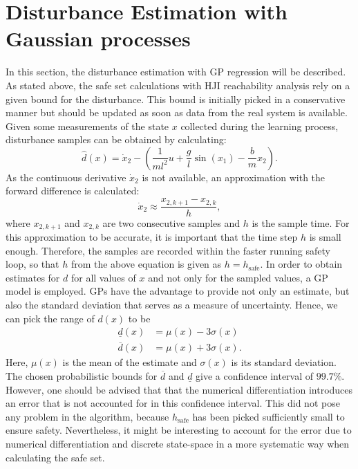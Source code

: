 \documentclass[../main.tex]{subfiles}
\begin{document}
\section{Disturbance Estimation with Gaussian processes}\label{sec:implementation_GP}
In this section, the disturbance estimation with GP regression will be described. As stated above, the safe set calculations with HJI reachability analysis rely on a given bound for the disturbance. This bound is initially picked in a conservative manner but should be updated as soon as data from the real system is available. Given some measurements of the state $x$ collected during the learning process, disturbance samples can be obtained by calculating:
\begin{equation}
    \hat{d}(x)=\dot{x}_2-\left(\frac{1}{ml^2}u+\frac{g}{l}\sin(x_1)-\frac{b}{m}x_2\right).
\end{equation}
As the continuous derivative $\dot{x}_2$ is not available, an approximation with the forward difference is calculated:
\begin{equation}
    \dot{x}_2 \approx \frac{x_{2,k+1}-x_{2,k}}{h},
\end{equation}
where $x_{2,k+1}$ and $x_{2,k}$ are two consecutive samples and $h$ is the sample time.
For this approximation to be accurate, it is important that the time step $h$ is small enough. Therefore, the samples are recorded within the faster running safety loop, so that $h$ from the above equation is given as $h = h_{\text{safe}}$.
In order to obtain estimates for $d$ for all values of $x$ and not only for the sampled values, a GP model is employed. GPs have the advantage to provide not only an estimate, but also the standard deviation that serves as a measure of uncertainty. Hence, we can pick the range of $d(x)$ to be
\begin{align}
    \underline{d}(x) &= \mu(x)-3\sigma(x)\\
    \overline{d}(x) &= \mu(x)+3\sigma(x).
\end{align}
Here, $\mu(x)$ is the mean of the estimate and $\sigma(x)$ is its standard deviation. The chosen  probabilistic bounds for $\overline{d}$ and $\underline{d}$ give a confidence interval of $99.7\%$. However, one should be advised that that the numerical differentiation introduces an error that is not accounted for in this confidence interval. This did not pose any problem in the algorithm, because $h_{\text{safe}}$ has been picked sufficiently small to ensure safety. Nevertheless, it might be interesting to account for the error due to numerical differentiation and discrete state-space in a more systematic way when calculating the safe set. \par
\end{document}
